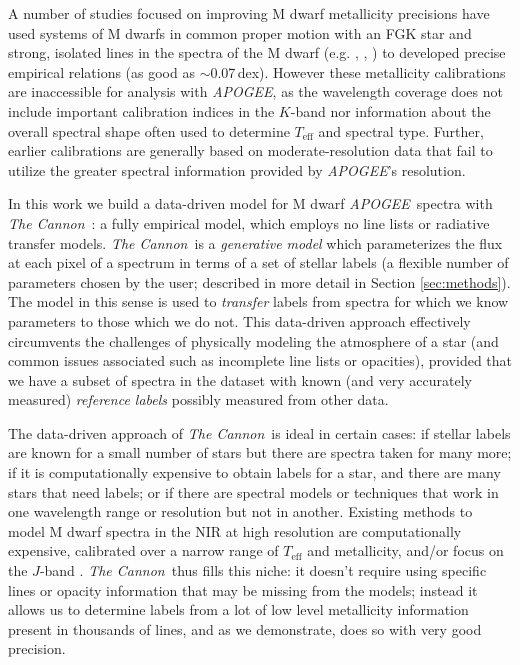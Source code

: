 \documentclass[twocolumn]{aastex62}
\newcommand{\apogee}{\textsl{APOGEE}}
\newcommand{\thecannon}{\textsl{The Cannon}}
\newcommand{\teff}{T_{\mathrm{eff}}}
\begin{document}
A number of studies focused on improving M dwarf metallicity precisions have used systems of M dwarfs in common proper motion with an FGK star and strong, isolated lines in the spectra of the M dwarf (e.g. \citealt{Terrien:2012}, \citealt{Rojas-Ayala:2012}, \citealt{Newton:2014}) to developed precise empirical relations (as good as $\sim$0.07\,dex). However these metallicity calibrations are inaccessible for analysis with \apogee, as the wavelength coverage does not include important calibration indices in the $K$-band nor information about the overall spectral shape often used to determine $\teff$ and spectral type. Further, earlier calibrations are generally based on moderate-resolution data \citep[with some exceptions,][]{Neves:2014, Lindgren:2016} that fail to utilize the greater spectral information provided by \apogee's resolution.

In this work we build a data-driven model for M dwarf \apogee\ spectra with \thecannon\ \citep{Ness:2015,Casey:2016,Ho:2017a,Behmard2019}: a fully empirical model, which employs no line lists or radiative transfer models. 
\thecannon\ is a \emph{generative model} which parameterizes the flux at each pixel of a spectrum in terms of a set of stellar labels (a flexible number of parameters chosen by the user; described in more detail in Section \ref{sec:methods}). The model in this sense is used to \emph{transfer} labels from spectra for which we know parameters to those which we do not. This data-driven approach effectively circumvents the challenges of physically modeling the atmosphere of a star (and common issues associated such as incomplete line lists or opacities), provided that we have a subset of spectra in the dataset with known (and very accurately measured) \emph{reference labels} possibly measured from other data. 

The data-driven approach of \thecannon\ is ideal in certain cases:
if stellar labels are known for a small number of stars
but there are spectra taken for many more;
if it is computationally expensive to obtain labels for a star, and
there are many stars that need labels;
or if there are spectral models or techniques that work in one wavelength range or resolution but not in another.
Existing methods to model M dwarf spectra in the NIR at high resolution are computationally expensive, calibrated over a narrow range of $\teff$ and metallicity, and/or focus on the $J$-band \citep{Lindgren:2016, Lindgren:2017}. \thecannon\ thus fills this niche: it doesn't require using specific lines or opacity information that may be missing from the models; instead it allows us to determine labels from a lot of low level metallicity information present in thousands of lines, and as we demonstrate, does so with very good precision.
\end{document}
